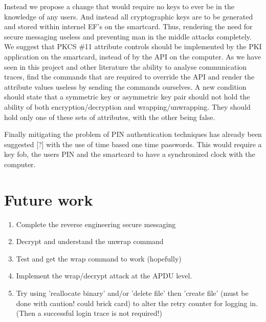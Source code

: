 \documentclass[bsc,frontabs,twoside,singlespacing,parskip,deptreport]{infthesis}     %
\begin{document}
Instead we propose a change that would require no keys to ever be in the knowledge of any users. And instead all cryptographic keys are to be generated and stored within internel EF's on the smartcard. Thus, rendering the need for secure messaging useless and preventing man in the middle attacks completely. We suggest that PKCS \#11 attribute controls should be implemented by the PKI application on the smartcard, instead of by the API on the computer. As we have seen in this project and other literature the ability to analyse communication traces, find the commands that are required to override the API and render the attribute values useless by sending the commands ourselves. A new condition should state that a symmetric key or asymmetric key pair should not hold the ability of both encryption/decryption and wrapping/unwrapping. They should hold only one of these sets of attributes, with the other being false.

Finally mitigating the problem of PIN authentication techniques has already been suggested [?] with the use of time based one time passwords. This would require a key fob, the users PIN and the smartcard to have a synchronized clock with the computer. 

\chapter{Future work}

\begin{enumerate}
\item Complete the reverse engineering secure messaging
\item Decrypt and understand the unwrap command
\item Test and get the wrap command to work (hopefully)
\item Implement the wrap/decrypt attack at the APDU level.

\item Try using 'reallocate binary' and/or 'delete file' then 'create file' (must be done with caution! could brick card) to alter the retry counter for logging in. (Then a successful login trace is not required!)

\end{enumerate}
\end{document}
